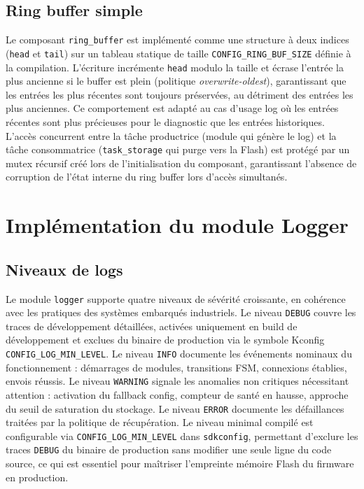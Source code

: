 \subsection{Ring buffer simple}
\label{subsec:ringbuf}

Le composant \texttt{ring\_buffer} est implémenté comme une structure
à deux indices (\texttt{head} et \texttt{tail}) sur un tableau statique
de taille \texttt{CONFIG\_RING\_BUF\_SIZE} définie à la compilation.
L'écriture incrémente \texttt{head} modulo la taille et écrase l'entrée
la plus ancienne si le buffer est plein (politique
\textit{overwrite-oldest}), garantissant que les entrées les plus
récentes sont toujours préservées, au détriment des entrées les plus
anciennes. Ce comportement est adapté au cas d'usage log où les
entrées récentes sont plus précieuses pour le diagnostic que les
entrées historiques. L'accès concurrent entre la tâche productrice
(module qui génère le log) et la tâche consommatrice
(\texttt{task\_storage} qui purge vers la Flash) est protégé par un
mutex récursif créé lors de l'initialisation du composant, garantissant
l'absence de corruption de l'état interne du ring buffer lors d'accès
simultanés.

\section{Implémentation du module Logger}
\label{sec:logger_impl}

\subsection{Niveaux de logs}
\label{subsec:loglevels}

Le module \texttt{logger} supporte quatre niveaux de sévérité
croissante, en cohérence avec les pratiques des systèmes embarqués
industriels. Le niveau \texttt{DEBUG} couvre les traces de développement
détaillées, activées uniquement en build de développement et exclues
du binaire de production via le symbole Kconfig
\texttt{CONFIG\_LOG\_MIN\_LEVEL}. Le niveau \texttt{INFO} documente
les événements nominaux du fonctionnement : démarrages de modules,
transitions FSM, connexions établies, envois réussis. Le niveau
\texttt{WARNING} signale les anomalies non critiques nécessitant
attention : activation du fallback config, compteur de santé en hausse,
approche du seuil de saturation du stockage. Le niveau \texttt{ERROR}
documente les défaillances traitées par la politique de récupération.
Le niveau minimal compilé est configurable via
\texttt{CONFIG\_LOG\_MIN\_LEVEL} dans \texttt{sdkconfig}, permettant
d'exclure les traces \texttt{DEBUG} du binaire de production sans
modifier une seule ligne du code source, ce qui est essentiel pour
maîtriser l'empreinte mémoire Flash du firmware en production.

